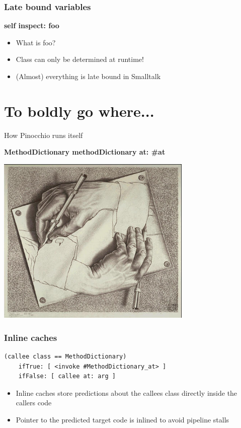 \documentclass{beamer}
\begin{document}
\begin{frame}[fragile]
    \frametitle{Late bound variables}
    {\bf self inspect: foo }
    \begin{itemize}
        \item What is foo?
        \item Class can only be determined at runtime! 
        \item (Almost) everything is late bound in Smalltalk
    \end{itemize}
\end{frame}

\section{To boldly go where...}

\begin{frame}{How Pinocchio runs itself}

    {\bf MethodDictionary methodDictionary at: \#at}

    \begin{center}\includegraphics[width=0.7\textwidth]{escher.jpg}\end{center}
\end{frame}

\begin{frame}[fragile]
    \frametitle{Inline caches}

    \begin{lstlisting}
(callee class == MethodDictionary)
    ifTrue: [ <invoke #MethodDictionary_at> ]
    ifFalse: [ callee at: arg ]
    \end{lstlisting}

    \begin{itemize}
        \item Inline caches store predictions about the callees class directly inside the callers code
        \item Pointer to the predicted target code is inlined to avoid pipeline stalls
    \end{itemize}
\end{frame}
\end{document}
